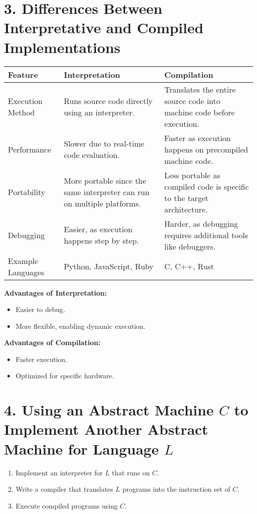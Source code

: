 \documentclass{article}
\begin{document}
\section*{3. Differences Between Interpretative and Compiled Implementations}

\begin{table}[h!]
\centering
\begin{tabular}{|p{2cm}|p{4cm}|p{4cm}|}
\hline
\textbf{Feature} & \textbf{Interpretation} & \textbf{Compilation} \\
\hline
Execution Method & Runs source code directly using an interpreter. & Translates the entire source code into machine code before execution. \\
\hline
Performance & Slower due to real-time code evaluation. & Faster as execution happens on precompiled machine code. \\
\hline
Portability & More portable since the same interpreter can run on multiple platforms. & Less portable as compiled code is specific to the target architecture. \\
\hline
Debugging & Easier, as execution happens step by step. & Harder, as debugging requires additional tools like debuggers. \\
\hline
Example Languages & Python, JavaScript, Ruby & C, C++, Rust \\
\hline
\end{tabular}
\end{table}

\textbf{Advantages of Interpretation:}
\begin{itemize}
    \item Easier to debug.
    \item More flexible, enabling dynamic execution.
\end{itemize}

\textbf{Advantages of Compilation:}
\begin{itemize}
    \item Faster execution.
    \item Optimized for specific hardware.
\end{itemize}

\section*{4. Using an Abstract Machine \( C \) to Implement Another Abstract Machine for Language \( L \)}

\begin{enumerate}
    \item Implement an interpreter for \( L \) that runs on \( C \).
    \item Write a compiler that translates \( L \) programs into the instruction set of \( C \).
    \item Execute compiled programs using \( C \).
\end{enumerate}
\end{document}
